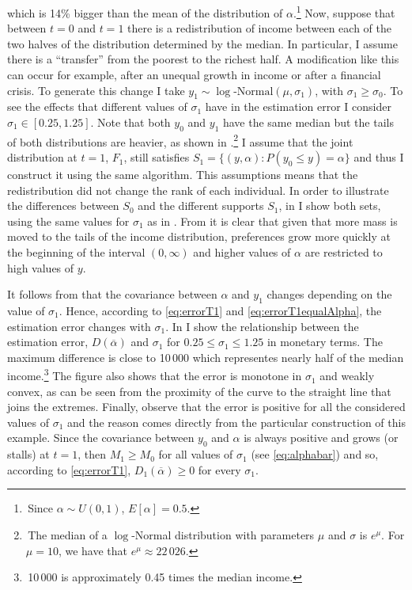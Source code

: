 \documentclass[english, a4paper, 12pt]{article}
\begin{document}
which is 14\% bigger than the mean of the distribution of $\alpha$.\footnote{\,Since $\alpha \sim U(0,1)$, $E[\alpha] = 0.5$.} Now, suppose that between $t = 0$ and $t = 1$ there is a redistribution of income between each of the two halves of the distribution determined by the median. In particular, I assume there is a ``transfer'' from the poorest to the richest half. A modification like this can occur for example, after an unequal growth in income or after a financial crisis. To generate this change I take $y_{1} \sim \log\text{-Normal}(\mu, \sigma_{1})$, with $\sigma_{1} \geq \sigma_{0}$. To see the effects that different values of $\sigma_{1}$ have in the estimation error I consider $\sigma_{1} \in [0.25, 1.25]$. Note that both $y_{0}$ and $y_{1}$ have the same median but the tails of both distributions are heavier, as shown in .\footnote{\,The median of a $\log$-Normal distribution with parameters $\mu$ and $\sigma$ is $e^{\mu}$. For $\mu = 10$, we have that $e^{\mu} \approx 22\,026$.} I assume that the joint distribution at $t = 1$, $F_{1}$, still satisfies $S_{1} = \{(y,\alpha) : P(y_{0} \leq y) = \alpha\}$ and thus I construct it using the same algorithm. This assumptions means that the redistribution did not change the rank of each individual. In order to illustrate the differences between $S_{0}$ and the different supports $S_{1}$, in  I show both sets, using the same values for $\sigma_{1}$ as in . From  it is clear that given that more mass is moved to the tails of the income distribution, preferences grow more quickly at the beginning of the interval $(0, \infty)$ and higher values of $\alpha$ are restricted to high values of $y$.


It follows from  that the covariance between $\alpha$ and $y_{1}$ changes depending on the value of $\sigma_{1}$. Hence, according to \eqref{eq:errorT1} and \eqref{eq:errorT1equalAlpha}, the estimation error changes with $\sigma_{1}$. In  I show the relationship between the estimation error, $D(\overline{\alpha})$ and $\sigma_{1}$ for $0.25 \leq \sigma_{1} \leq 1.25$ in monetary terms. The maximum difference is close to 10\,000 which representes nearly half of the median income.\footnote{\,10\,000 is approximately 0.45 times the median income.} The figure also shows that the error is monotone in $\sigma_{1}$ and weakly convex, as can be seen from the proximity of the curve to the straight line that joins the extremes. Finally, observe that the error is positive for all the considered values of $\sigma_{1}$ and the reason comes directly from the particular construction of this example. Since the covariance between $y_{0}$ and $\alpha$ is always positive and grows (or stalls) at $t=1$, then $M_{1} \geq M_{0}$ for all values of $\sigma_{1}$ (see \eqref{eq:alphabar}) and so, according to \eqref{eq:errorT1}, $D_{1}(\overline{\alpha}) \geq 0$ for every $\sigma_{1}$.
\end{document}
